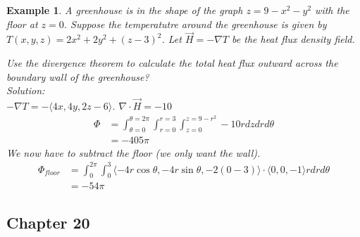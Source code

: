 \documentclass[11pt]{article}
\newtheorem{ex}{Example}
\begin{document}
      \begin{ex}
        A greenhouse is in the shape of the graph $z=9-x^{2}-y^{2}$ with the floor at $z=0$. Suppose the temperatutre around
        the greenhouse is given by $T(x,y,z) = 2x^{2}+2y^{2} + (z-3)^{2}$. Let $\vec{H} = -\nabla T$ be the heat flux density
        field.

        Use the divergence theorem to calculate the total heat flux outward across the boundary wall of the greenhouse? \\

        Solution: \\
        $-\nabla T = -\langle 4x, 4y, 2z-6 \rangle $. $\nabla \cdot \vec{H}  = -10$
        \begin{align*}
          \Phi
          &= \int_{\theta= 0}^{\theta = 2\pi}\int_{r=0}^{r=3}\int_{z=0}^{z=9-r^{2}} -10 r dz dr d\theta \\
          &= -405\pi
        \end{align*}
        We now have to subtract the floor (we only want the wall).
        \begin{align*}
          \Phi_{floor}
          &= \int_{0}^{2\pi}\int_{0}^{3} \langle -4r\cos\theta, -4r\sin\theta, -2(0-3) \rangle \cdot \langle 0, 0, -1 \rangle r dr d\theta\\
          &= -54\pi
        \end{align*}
      \end{ex}
      \subsection{Chapter 20}
\end{document}
